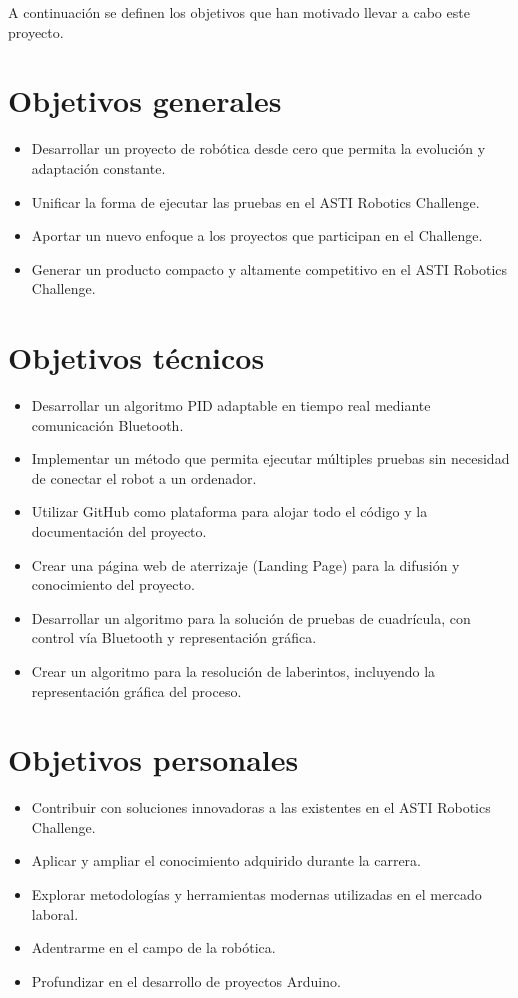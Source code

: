 
A continuación se definen los objetivos que han motivado llevar a cabo este proyecto.

\section{Objetivos generales}\label{objetivos-generales}

\begin{itemize}
\tightlist
\item
 Desarrollar un proyecto de robótica desde cero que permita la evolución y adaptación constante.
\item
 Unificar la forma de ejecutar las pruebas en el ASTI Robotics Challenge.
\item
 Aportar un nuevo enfoque a los proyectos que participan en el Challenge.
\item
 Generar un producto compacto y altamente competitivo en el ASTI Robotics Challenge.
\end{itemize}

\section{Objetivos técnicos}\label{objetivos-tecnicos}

\begin{itemize}
\tightlist
\item
 Desarrollar un algoritmo PID adaptable en tiempo real mediante comunicación Bluetooth.
\item
 Implementar un método que permita ejecutar múltiples pruebas sin necesidad de conectar el robot a un ordenador.
\item
 Utilizar GitHub como plataforma para alojar todo el código y la documentación del proyecto.
\item
 Crear una página web de aterrizaje (Landing Page) para la difusión y conocimiento del proyecto.
\item
 Desarrollar un algoritmo para la solución de pruebas de cuadrícula, con control vía Bluetooth y representación gráfica.
\item
 Crear un algoritmo para la resolución de laberintos, incluyendo la representación gráfica del proceso.
\end{itemize}

\section{Objetivos personales}\label{objetivos-personales}

\begin{itemize}
\tightlist
\item
  Contribuir con soluciones innovadoras a las existentes en el ASTI Robotics Challenge.
\item
  Aplicar y ampliar el conocimiento adquirido durante la carrera.
\item
  Explorar metodologías y herramientas modernas utilizadas en el mercado laboral.
\item
  Adentrarme en el campo de la robótica.
\item
  Profundizar en el desarrollo de proyectos Arduino.
\end{itemize}